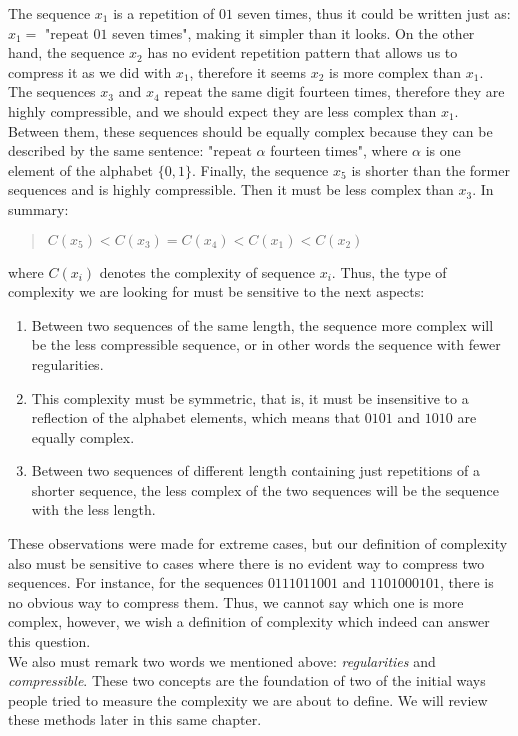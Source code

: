 The sequence $x_{1}$ is a repetition of $01$ seven times, thus it could be written just as: $x_{1}=$ "repeat $01$ seven times", making it simpler than it looks. On the other hand, the sequence $x_{2}$ has no evident repetition pattern that allows us to compress it as we did with $x_{1}$, therefore it seems $x_{2}$ is more complex than $x_{1}$. The sequences $x_{3}$ and $x_{4}$ repeat the same digit fourteen times, therefore they are highly compressible, and we should expect they are less complex than $x_{1}$. Between them, these sequences should be equally complex because they can be described by the same sentence: "repeat $\alpha$ fourteen times", where $\alpha$ is one element of the alphabet $\{ 0,1 \}$. Finally, the sequence $x_{5}$ is shorter than the former sequences and is highly compressible. Then it must be less complex than $x_{3}$. In summary:

\begin{quote}
\centering
$C(x_{5}) < C(x_{3}) = C(x_{4}) < C(x_{1}) < C(x_{2})$
\end{quote}

where $C(x_{i})$ denotes the complexity of sequence $x_{i}$. Thus, the type of complexity we are looking for must be sensitive to the next aspects:

\begin{enumerate}
	\item Between two sequences of the same length, the sequence more complex will be the less compressible sequence, or in other words the sequence with fewer regularities.
	\item This complexity must be symmetric, that is, it must be insensitive to a reflection of the alphabet elements, which means that $0101$ and $1010$ are equally complex.
	\item Between two sequences of different length containing just repetitions of a shorter sequence, the less complex of the two sequences will be the sequence with the less length.
\end{enumerate}

These observations were made for extreme cases, but our definition of complexity also must be sensitive to cases where there is no evident way to compress two sequences. For instance, for the sequences $0111011001$ and $1101000101$, there is no obvious way to compress them. Thus, we cannot say which one is more complex, however, we wish a definition of complexity which indeed can answer this question.\\ 

We also must remark two words we mentioned above: \textit{regularities} and \textit{compressible}. These two concepts are the foundation of two of the initial ways people tried to measure the complexity we are about to define. We will review these methods later in this same chapter.\\

